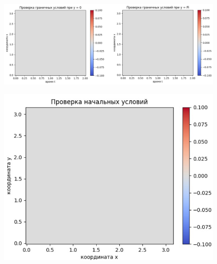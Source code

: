 \documentclass[a4paper,14pt]{article}
\begin{document}
\begin{figure}[h!]
\centering
\includegraphics[scale=0.3]{гу y.jpg}
\caption{\label{pic5}}
\end{figure} 

\begin{figure}[h!]
\centering
\includegraphics[scale=0.3]{ну.jpg}
\caption{\label{pic6}}
\end{figure} 
\end{document}

